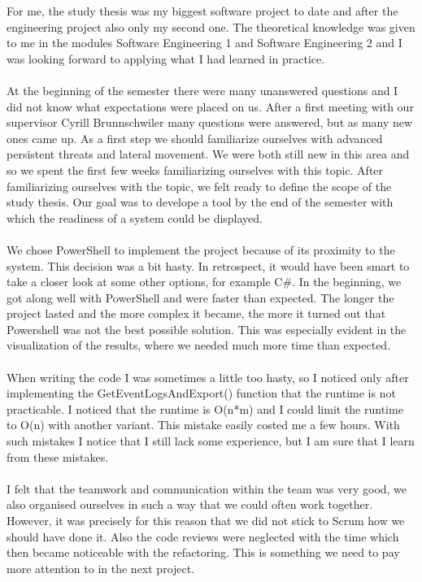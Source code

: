 \thispagestyle{plain}
\renewcommand\section{\stdsection}
For me, the study thesis was my biggest software project to date and after the engineering project also only my second one. The theoretical knowledge was given to me in the modules Software Engineering 1 and Software Engineering 2 and I was looking forward to applying what I had learned in practice. 
\\\\
At the beginning of the semester there were many unanswered questions and I did not know what expectations were placed on us. After a first meeting with our supervisor Cyrill Brunnschwiler many questions were answered, but as many new ones came up. As a first step we should familiarize ourselves with advanced persistent threats and lateral movement. We were both still new in this area and so we spent the first few weeks familiarizing ourselves with this topic. After familiarizing ourselves with the topic, we felt ready to define the scope of the study thesis. Our goal was to develope a tool by the end of the semester with which the readiness of a system could be displayed.
\\\\
We chose PowerShell to implement the project because of its proximity to the system. This decision was a bit hasty. In retrospect, it would have been smart to take a closer look at some other options, for example C\#. In the beginning, we got along well with PowerShell and were faster than expected. The longer the project lasted and the more complex it became, the more it turned out that Powershell was not the best possible solution. This was especially evident in the visualization of the results, where we needed much more time than expected.
\\\\
When writing the code I was sometimes a little too hasty, so I noticed only after implementing the GetEventLogsAndExport() function that the runtime is not practicable. I noticed that the runtime is O(n*m) and I could limit the runtime to O(n) with another variant. This mistake easily costed me a few hours. With such mistakes I notice that I still lack some experience, but I am sure that I learn from these mistakes.
\\\\
I felt that the teamwork and communication within the team was very good, we also organised ourselves in such a way that we could often work together. However, it was precisely for this reason that we did not stick to Scrum how we should have done it. Also the code reviews were neglected with the time which then became noticeable with the refactoring. This is something we need to pay more attention to in the next project.
